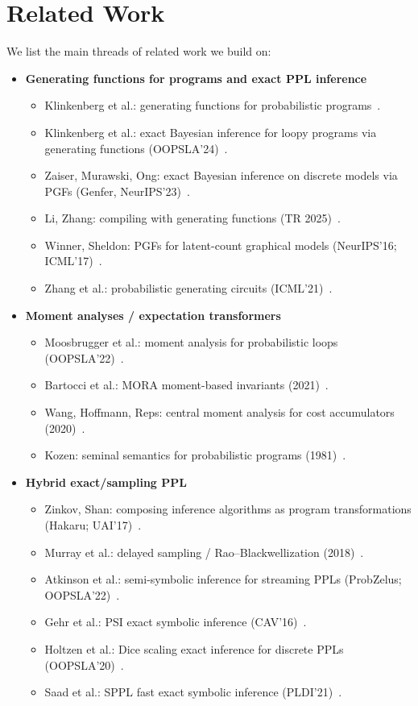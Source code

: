 \section{Related Work}
We list the main threads of related work we build on:
\begin{itemize}
  \item \textbf{Generating functions for programs and exact PPL inference}
  \begin{itemize}
    \item Klinkenberg et al.: generating functions for probabilistic programs~\cite{klinkenberg2020gfpp}.
    \item Klinkenberg et al.: exact Bayesian inference for loopy programs via generating functions (OOPSLA'24)~\cite{klinkenberg2024loopy}.
    \item Zaiser, Murawski, Ong: exact Bayesian inference on discrete models via PGFs (Genfer, NeurIPS'23)~\cite{zaiser2023pgf}.
    \item Li, Zhang: compiling with generating functions (TR 2025)~\cite{li2025compiling}.
    \item Winner, Sheldon: PGFs for latent-count graphical models (NeurIPS'16; ICML'17)~\cite{winner2016pgf}.
    \item Zhang et al.: probabilistic generating circuits (ICML'21)~\cite{zhang2021pgc}.
  \end{itemize}
  \item \textbf{Moment analyses / expectation transformers}
  \begin{itemize}
    \item Moosbrugger et al.: moment analysis for probabilistic loops (OOPSLA'22)~\cite{moosbrugger2022moment}.
    \item Bartocci et al.: MORA moment-based invariants (2021)~\cite{bartocci2021mora}.
    \item Wang, Hoffmann, Reps: central moment analysis for cost accumulators (2020)~\cite{wang2020central}.
    \item Kozen: seminal semantics for probabilistic programs (1981)~\cite{kozen1981semantics}.
  \end{itemize}
  \item \textbf{Hybrid exact/sampling PPL}
  \begin{itemize}
    \item Zinkov, Shan: composing inference algorithms as program transformations (Hakaru; UAI'17)~\cite{zinkov2017hakaru}.
    \item Murray et al.: delayed sampling / Rao--Blackwellization (2018)~\cite{murray2018delayed}.
    \item Atkinson et al.: semi-symbolic inference for streaming PPLs (ProbZelus; OOPSLA'22)~\cite{atkinson2022semisymbolic}.
    \item Gehr et al.: PSI exact symbolic inference (CAV'16)~\cite{gehr2016psi}.
    \item Holtzen et al.: Dice scaling exact inference for discrete PPLs (OOPSLA'20)~\cite{holtzen2020dice}.
    \item Saad et al.: SPPL fast exact symbolic inference (PLDI'21)~\cite{saad2021sppl}.
  \end{itemize}
\end{itemize}
